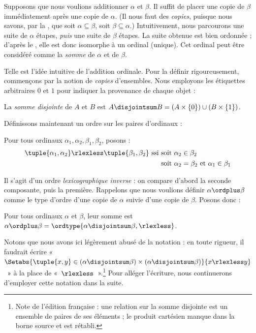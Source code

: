 \documentclass[../../../include/open-logic-section]{subfiles}
\begin{document}

Supposons que nous voulions additionner $\alpha$ et $\beta$.
Il suffit de placer une {copie} de $\beta$ immédiatement après
une copie de $\alpha$. (Il nous faut des \emph{copies}, puisque
nous savons, par la ,
que soit $\alpha \subseteq \beta$, soit
$\beta \subseteq \alpha$.) Intuitivement, nous parcourons
une suite de $\alpha$ étapes, \emph{puis} une suite de
$\beta$ étapes. La suite obtenue est bien ordonnée ;
d'après le
,
elle est donc isomorphe à un ordinal (unique). Cet ordinal
peut être considéré comme la \emph{somme} de $\alpha$
et de $\beta$.

Telle est l'idée intuitive de l'addition ordinale. Pour la
définir rigoureusement, commençons par la notion de
\emph{copies} d'ensembles. Nous employons les étiquettes
arbitraires $0$ et $1$ pour indiquer la provenance
de chaque objet :

\begin{defn}
La \emph{somme disjointe} de $A$ et $B$ est
$A \disjointsum B = (A\times \{0\}) \cup
(B \times \{1\})$.
\end{defn}

Définissons maintenant un ordre sur les paires d'ordinaux :

\begin{defn}
Pour tous ordinaux $\alpha_1, \alpha_2, \beta_1, \beta_2$,
posons :
\begin{align*}
	\tuple{\alpha_1, \alpha_2} \rlexless
	\tuple{\beta_1, \beta_2}\text{ ssi }&
	\text{soit $\alpha_2 \in \beta_2$}\\
	& \text{soit $\alpha_2 = \beta_2$ et $\alpha_1 \in \beta_1$}
\end{align*}
\end{defn}

Il s'agit d'un ordre \emph{lexicographique inverse} :
on compare d'abord la seconde composante, puis la première.
Rappelons que nous voulions définir
$\alpha \ordplus \beta$ comme le type d'ordre d'une copie
de $\alpha$ suivie d'une copie de $\beta$. Posons donc :

\begin{defn}
Pour tous ordinaux $\alpha$ et $\beta$, leur somme est
$\alpha \ordplus \beta =
\ordtype{\alpha \disjointsum \beta, \rlexless}$.
\end{defn}
\noindent
Notons que nous avons ici légèrement abusé de la notation :
en toute rigueur, il faudrait écrire
«~$\Setabs{\tuple{x,y}\in (\alpha\disjointsum\beta)\times(\alpha\disjointsum\beta)}
{x \rlexless y}$~» à la place de «~$\rlexless$~».\footnote{Note de l'édition française : une relation sur la somme disjointe est un ensemble de paires de ses éléments ; le produit cartésien manque dans la borne source et est rétabli.}
Pour alléger l'écriture, nous continuerons d'employer
cette notation dans la suite.
\end{document}
